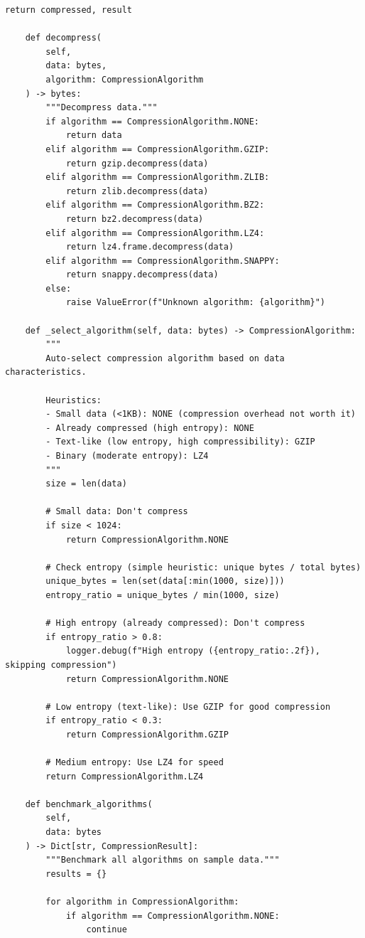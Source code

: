 \begin{lstlisting}[style=python, caption={Compression Optimizer for Data Types}]
        return compressed, result

    def decompress(
        self,
        data: bytes,
        algorithm: CompressionAlgorithm
    ) -> bytes:
        """Decompress data."""
        if algorithm == CompressionAlgorithm.NONE:
            return data
        elif algorithm == CompressionAlgorithm.GZIP:
            return gzip.decompress(data)
        elif algorithm == CompressionAlgorithm.ZLIB:
            return zlib.decompress(data)
        elif algorithm == CompressionAlgorithm.BZ2:
            return bz2.decompress(data)
        elif algorithm == CompressionAlgorithm.LZ4:
            return lz4.frame.decompress(data)
        elif algorithm == CompressionAlgorithm.SNAPPY:
            return snappy.decompress(data)
        else:
            raise ValueError(f"Unknown algorithm: {algorithm}")

    def _select_algorithm(self, data: bytes) -> CompressionAlgorithm:
        """
        Auto-select compression algorithm based on data characteristics.

        Heuristics:
        - Small data (<1KB): NONE (compression overhead not worth it)
        - Already compressed (high entropy): NONE
        - Text-like (low entropy, high compressibility): GZIP
        - Binary (moderate entropy): LZ4
        """
        size = len(data)

        # Small data: Don't compress
        if size < 1024:
            return CompressionAlgorithm.NONE

        # Check entropy (simple heuristic: unique bytes / total bytes)
        unique_bytes = len(set(data[:min(1000, size)]))
        entropy_ratio = unique_bytes / min(1000, size)

        # High entropy (already compressed): Don't compress
        if entropy_ratio > 0.8:
            logger.debug(f"High entropy ({entropy_ratio:.2f}), skipping compression")
            return CompressionAlgorithm.NONE

        # Low entropy (text-like): Use GZIP for good compression
        if entropy_ratio < 0.3:
            return CompressionAlgorithm.GZIP

        # Medium entropy: Use LZ4 for speed
        return CompressionAlgorithm.LZ4

    def benchmark_algorithms(
        self,
        data: bytes
    ) -> Dict[str, CompressionResult]:
        """Benchmark all algorithms on sample data."""
        results = {}

        for algorithm in CompressionAlgorithm:
            if algorithm == CompressionAlgorithm.NONE:
                continue


\end{lstlisting}
